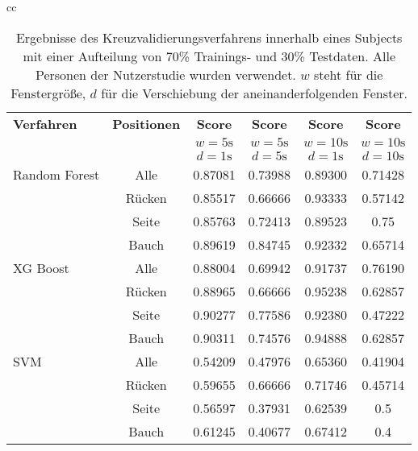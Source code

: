 \begin{table}[H]
  \begin{tabular}{cc}
    \begin{minipage}{1\textwidth}
      \begin{center}
          \begin{tabular}{ | l | c | c | c | c | c | }
            \hline
            \textbf{Verfahren} & \textbf{Positionen} & \textbf{Score} & \textbf{Score} & \textbf{Score} & \textbf{Score} \\ 
            & & \textbf{$w=5\si{\s}$} & \textbf{$w=5\si{\s}$} & \textbf{$w=10\si{\s}$} & \textbf{$w=10\si{\s}$} \\
            & & \textbf{$d=1\si{\s}$} & \textbf{$d=5\si{\s}$} & \textbf{$d=1\si{\s}$} & \textbf{$d=10\si{\s}$} \\ \hline
            Random Forest & Alle &  0.87081 & 0.73988 & 0.89300 & 0.71428 \\ 
             & Rücken & 0.85517 & 0.66666 & 0.93333 & 0.57142 \\
             & Seite  & 0.85763 & 0.72413 & 0.89523 & 0.75 \\
             & Bauch  & 0.89619 & 0.84745 & 0.92332 & 0.65714 \\ \hline
            XG Boost  & Alle & 0.88004 & 0.69942 & 0.91737 & 0.76190 \\ 
             & Rücken & 0.88965 & 0.66666 & 0.95238 & 0.62857 \\
             & Seite  & 0.90277 & 0.77586 & 0.92380 & 0.47222 \\
             & Bauch  & 0.90311 & 0.74576 & 0.94888 & 0.62857 \\ \hline
            SVM & Alle& 0.54209 & 0.47976 & 0.65360 & 0.41904 \\ 
             & Rücken & 0.59655 & 0.66666 & 0.71746 & 0.45714 \\
             & Seite  & 0.56597 & 0.37931 & 0.62539 & 0.5 \\
             & Bauch  & 0.61245 & 0.40677 & 0.67412 & 0.4 \\
            \hline
          \end{tabular}
      \end{center}
    \end{minipage}
  \end{tabular}
  \caption{Ergebnisse des Kreuzvalidierungsverfahrens innerhalb eines Subjects mit einer Aufteilung von 70\% Trainings- und 30\% Testdaten. Alle Personen der Nutzerstudie wurden verwendet. $w$ steht für die Fenstergröße, $d$ für die Verschiebung der aneinanderfolgenden Fenster.}
  \label{evaluation:within_subject_results}
\end{table}

